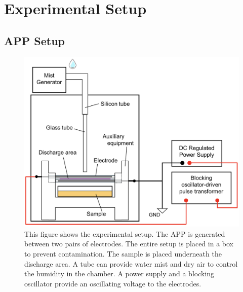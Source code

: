 \chapter{Experimental Setup}
\label{chap:experiment}

\section{APP Setup}

\begin{figure}
    \centering
    \includegraphics[width=1\textwidth]{images/Process_setup.png}
    \caption[Experimental setup]{This figure shows the experimental setup. The APP is generated between two pairs of electrodes. The entire setup is placed in a box to prevent contamination. The sample is placed underneath the discharge area. A tube can provide water mist and dry air to control the humidity in the chamber. A power supply and a blocking oscillator provide an oscillating voltage to the electrodes.}
    \label{fig:setup}
\end{figure}

